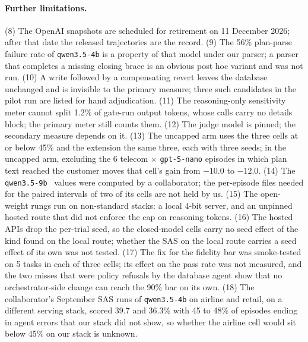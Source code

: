 \paragraph{Further limitations.} (8) The OpenAI snapshots are scheduled for retirement on 11 December 2026; after that date the released trajectories are the record. (9) The 56\% plan-parse failure rate of \texttt{qwen3.5-4b} is a property of that model under our parser; a parser that completes a missing closing brace is an obvious post hoc variant and was not run. (10) A write followed by a compensating revert leaves the database unchanged and is invisible to the primary measure; three such candidates in the pilot run are listed for hand adjudication. (11) The reasoning-only sensitivity meter cannot split 1.2\% of gate-run output tokens, whose calls carry no details block; the primary meter still counts them. (12) The judge model is pinned; the secondary measure depends on it. (13) The uncapped arm uses the three cells at or below 45\% and the extension the same three, each with three seeds; in the uncapped arm, excluding the 6 telecom $\times$ \texttt{gpt-5-nano} episodes in which plan text reached the customer moves that cell's gain from $-10.0$ to $-12.0$. (14) The \texttt{qwen3.5-9b} \Sone\ values were computed by a collaborator; the per-episode files needed for the paired intervals of two of its cells are not held by us. (15) The open-weight rungs run on non-standard stacks: a local 4-bit server, and an unpinned hosted route that did not enforce the cap on reasoning tokens. (16) The hosted APIs drop the per-trial seed, so the closed-model cells carry no seed effect of the kind found on the local route; whether the SAS on the local route carries a seed effect of its own was not tested. (17) The fix for the fidelity bar was smoke-tested on 5 tasks in each of three cells; its effect on the pass rate was not measured, and the two misses that were policy refusals by the database agent show that no orchestrator-side change can reach the 90\% bar on its own. (18) The collaborator's September SAS runs of \texttt{qwen3.5-4b} on airline and retail, on a different serving stack, scored 39.7 and 36.3\% with 45 to 48\% of episodes ending in agent errors that our stack did not show, so whether the airline cell would sit below 45\% on our stack is unknown.
